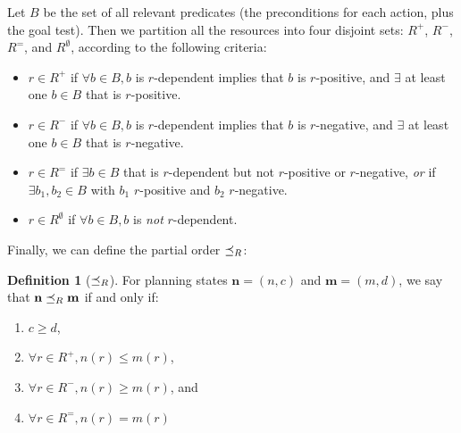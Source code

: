\documentclass[letterpaper]{article}
\theoremstyle{plain} \newtheorem{theorem}{Theorem} \newtheorem{proposition}{Proposition} \newtheorem{lemma}{Lemma}
\theoremstyle{definition} \newtheorem{definition}{Definition} \newtheorem{conjecture}{Conjecture} \newtheorem*{example}{Example}
\theoremstyle{remark} \newtheorem*{remark}{Remark} \newtheorem*{note}{Note} \newtheorem{case}{Case}
\begin{document}
Let $B$ be the set of all relevant predicates (the preconditions for each action, plus the goal test). Then we partition all the resources into four disjoint sets: $R^+$, $R^-$, $R^=$, and $R^\emptyset$, according to the following criteria:
\begin{itemize}
	\item $r \in R^+$ if $\forall b \in B, b$ is $r$-dependent implies that $b$ is $r$-positive, and $\exists$ at least one $b \in B$ that is $r$-positive.
	\item $r \in R^-$ if $\forall b \in B, b$ is $r$-dependent implies that $b$ is $r$-negative, and $\exists$ at least one $b \in B$ that is $r$-negative.
	\item $r \in R^=$ if $\exists b \in B$ that is $r$-dependent but not $r$-positive or $r$-negative, \emph{or} if $\exists b_1, b_2 \in B$ with $b_1$ $r$-positive and $b_2$ $r$-negative.
	\item $r \in R^\emptyset$ if $\forall b \in B, b$ is \emph{not} $r$-dependent.
\end{itemize}

Finally, we can define the partial order $\preceq_R$:
\begin{definition}[$\preceq_R$]
	\label{def-po}
	For planning states $\mathbf{n} = (n, c)$ and $\mathbf{m} = (m, d)$, we say that $\mathbf{n} \preceq_R \mathbf{m}$ if and only if:
	\begin{enumerate}
		\item $c \ge d$,
		\item $\forall r \in R^+, n(r) \le m(r)$,
		\item $\forall r \in R^-, n(r) \ge m(r)$, and
		\item $\forall r \in R^=, n(r) = m(r)$
	\end{enumerate}
\end{definition}
\end{document}
